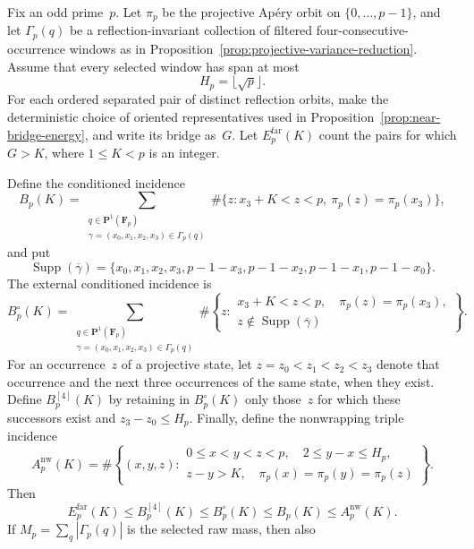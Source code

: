 \begin{proposition}
\label{prop:far-bridge-incidence}
Fix an odd prime~$p$.  Let $\pi_p$ be the projective Ap\'ery orbit on
$\{0,\ldots,p-1\}$, and let $\Gamma_p(q)$ be a reflection-invariant
collection of filtered four-consecutive-occurrence windows as in
Proposition~\ref{prop:projective-variance-reduction}.  Assume that every
selected window has span at most
\[
 H_p=\lfloor\sqrt p\rfloor.
\]
For each ordered separated pair of distinct reflection orbits, make the
deterministic choice of oriented representatives used in
Proposition~\ref{prop:near-bridge-energy}, and write its bridge as~$G$.
Let $E_p^{\mathrm{far}}(K)$ count the pairs for which $G>K$, where
$1\le K<p$ is an integer.

Define the conditioned incidence
\[
 B_p(K)=
 \sum_{\substack{q\in\mathbf P^1(\mathbf F_p)\\
                   \gamma=(x_0,x_1,x_2,x_3)\in\Gamma_p(q)}}
 \#\{z:x_3+K<z<p,\ \pi_p(z)=\pi_p(x_3)\},
\]
and put
\[
 \operatorname{Supp}(\overline\gamma)
 =\{x_0,x_1,x_2,x_3,
     p-1-x_3,p-1-x_2,p-1-x_1,p-1-x_0\}.
\]
The external conditioned incidence is
\[
 B_p^\circ(K)=
 \sum_{\substack{q\in\mathbf P^1(\mathbf F_p)\\
                   \gamma=(x_0,x_1,x_2,x_3)\in\Gamma_p(q)}}
 \#\left\{z:
 \begin{array}{c}
 x_3+K<z<p,\quad \pi_p(z)=\pi_p(x_3),\\
 z\notin\operatorname{Supp}(\overline\gamma)
 \end{array}
 \right\}.
\]
For an occurrence~$z$ of a projective state, let
$z=z_0<z_1<z_2<z_3$ denote that occurrence and the next three occurrences
of the same state, when they exist.  Define $B_p^{[4]}(K)$ by retaining in
$B_p^\circ(K)$ only those~$z$ for which these successors exist and
$z_3-z_0\le H_p$.  Finally, define the nonwrapping triple incidence
\[
 A_p^{\mathrm{nw}}(K)=
 \#\left\{(x,y,z):
 \begin{array}{c}
 0\le x<y<z<p,\quad 2\le y-x\le H_p,\\
 z-y>K,\quad \pi_p(x)=\pi_p(y)=\pi_p(z)
 \end{array}
 \right\}.
\]
Then
\begin{equation}
 E_p^{\mathrm{far}}(K)\le B_p^{[4]}(K)
 \le B_p^\circ(K)
 \le B_p(K)\le A_p^{\mathrm{nw}}(K).
\label{eq:far-incidence-hierarchy}
\end{equation}
If $M_p=\sum_q|\Gamma_p(q)|$ is the selected raw mass, then also
\begin{equation}

\end{equation}
\end{proposition}

